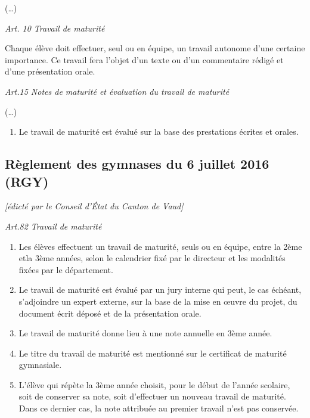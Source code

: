 \documentclass[
  10pt,
  french,
  a5paper,
  openany]{book}
\providecommand{\tightlist}{%
  \setlength{\itemsep}{0pt}\setlength{\parskip}{0pt}}
\begin{document}
(\ldots)


\emph{Art. 10 Travail de maturité}

Chaque élève doit effectuer, seul ou en équipe, un travail autonome d'une certaine importance. Ce travail fera l'objet d'un texte ou d'un commentaire rédigé et d'une présentation orale.


\emph{Art.15 Notes de maturité et évaluation du travail de maturité}

(\ldots)

\begin{enumerate}
\def\labelenumi{\arabic{enumi}.}
\setcounter{enumi}{1}
\tightlist
\item
  Le travail de maturité est évalué sur la base des prestations écrites et orales.
\end{enumerate}


\clearpage

\hypertarget{ruxe8glement-des-gymnases-du-6-juillet-2016-rgy}{%
\subsection*{Règlement des gymnases du 6 juillet 2016 (RGY)}\label{ruxe8glement-des-gymnases-du-6-juillet-2016-rgy}}

\emph{{[}édicté par le Conseil d'État du Canton de Vaud{]}}

\emph{Art.82 Travail de maturité}

\begin{enumerate}
\def\labelenumi{\arabic{enumi}.}
\tightlist
\item
  Les élèves effectuent un travail de maturité, seuls ou en équipe, entre la 2ème etla 3ème années, selon le calendrier fixé par le directeur et les modalités fixées par le département.
\item
  Le travail de maturité est évalué par un jury interne qui peut, le cas échéant, s'adjoindre un expert externe, sur la base de la mise en œuvre du projet, du document écrit déposé et de la présentation orale.
\item
  Le travail de maturité donne lieu à une note annuelle en 3ème année.
\item
  Le titre du travail de maturité est mentionné sur le certificat de maturité gymnasiale.
\item
  L'élève qui répète la 3ème année choisit, pour le début de l'année scolaire, soit de conserver sa note, soit d'effectuer un nouveau travail de maturité. Dans ce dernier cas, la note attribuée au premier travail n'est pas conservée.
\end{enumerate}
\end{document}
